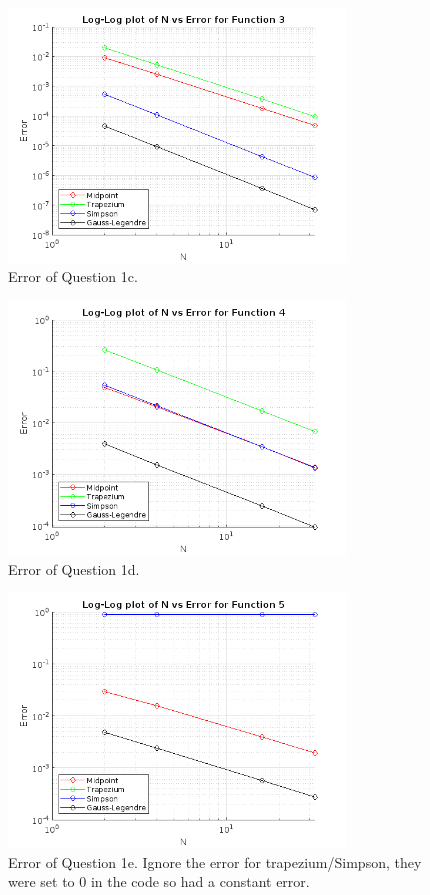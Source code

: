 \documentclass[letterpaper, reqno,11pt]{article}
\begin{document}
\begin{figure}[htpb]
    \centering
    \includegraphics[width=0.8\textwidth]{q1c}
    \caption{Error of Question 1c.}
    \label{fig:q1c}
\end{figure}
\begin{figure}[htpb]
    \centering
    \includegraphics[width=0.8\textwidth]{q1d}
    \caption{Error of Question 1d.}
    \label{fig:q1d}
\end{figure}
\begin{figure}[htpb]
    \centering
    \includegraphics[width=0.8\textwidth]{q1e}
    \caption{Error of Question 1e. Ignore the error for trapezium/Simpson, they were set to 0 in the code so had a constant error.}
    \label{fig:q1e}
\end{figure}
\end{document}
